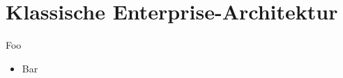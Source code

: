 \section{Klassische Enterprise-Architektur}

\begin{frame}{Foo}
    \begin{itemize}
        \item Bar
    \end{itemize}
\end{frame}
